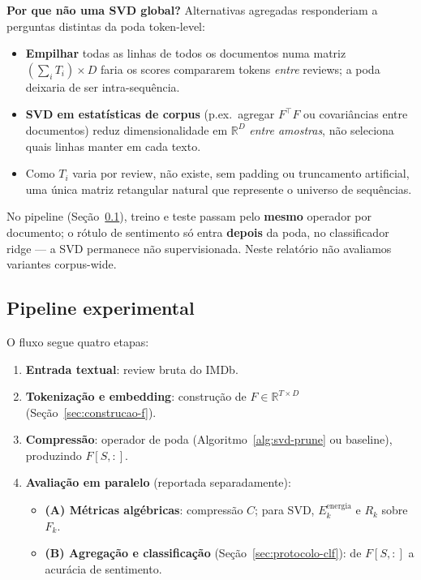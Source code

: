 \textbf{Por que não uma SVD global?} Alternativas agregadas responderiam a perguntas distintas da poda token-level:
\begin{itemize}
    \item \textbf{Empilhar} todas as linhas de todos os documentos numa matriz $(\sum_i T_i) \times D$ faria os scores compararem tokens \emph{entre} reviews; a poda deixaria de ser intra-sequência.
    \item \textbf{SVD em estatísticas de corpus} (p.ex.\ agregar $F^\top F$ ou covariâncias entre documentos) reduz dimensionalidade em $\mathbb{R}^D$ \emph{entre amostras}, não seleciona quais linhas manter em cada texto.
    \item Como $T_i$ varia por review, não existe, sem padding ou truncamento artificial, uma única matriz retangular natural que represente o universo de sequências.
\end{itemize}

No pipeline (Seção~\ref{sec:pipeline}), treino e teste passam pelo \textbf{mesmo} operador por documento; o rótulo de sentimento só entra \textbf{depois} da poda, no classificador ridge --- a SVD permanece não supervisionada. Neste relatório não avaliamos variantes corpus-wide.

\subsection{Pipeline experimental}\label{sec:pipeline}

O fluxo segue quatro etapas:

\begin{enumerate}
    \item \textbf{Entrada textual}: review bruta do IMDb.
    \item \textbf{Tokenização e embedding}: construção de $F \in \mathbb{R}^{T \times D}$ (Seção~\ref{sec:construcao-f}).
    \item \textbf{Compressão}: operador de poda (Algoritmo~\ref{alg:svd-prune} ou baseline), produzindo $F[S,:]$.
    \item \textbf{Avaliação em paralelo} (reportada separadamente):
    \begin{itemize}
        \item \textbf{(A) Métricas algébricas}: compressão $C$; para SVD, $E_k^{\mathrm{energia}}$ e $R_k$ sobre $F_k$.
        \item \textbf{(B) Agregação e classificação} (Seção~\ref{sec:protocolo-clf}): de $F[S,:]$ a acurácia de sentimento.
    \end{itemize}
\end{enumerate}

